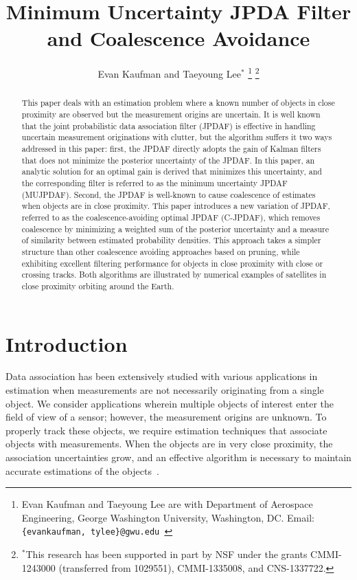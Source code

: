 \documentclass[letterpaper, 10pt, conference]{ieeeconf}
\title{\LARGE \bf
Minimum Uncertainty JPDA Filter and Coalescence Avoidance}
\author{Evan Kaufman and Taeyoung Lee$^*$%
 \thanks{Evan Kaufman and Taeyoung Lee are with Department of Aerospace Engineering, George Washington University, Washington, DC. Email: {\tt\footnotesize \{evankaufman, tylee\}@gwu.edu }}
\thanks{$^*$This research has been supported in part by NSF under the grants CMMI-1243000 (transferred from 1029551), CMMI-1335008, and CNS-1337722.}}
\begin{document}
\allowdisplaybreaks


\maketitle \thispagestyle{empty} \pagestyle{empty}

\begin{abstract}
This paper deals with an estimation problem where a known number of objects in close proximity are observed but the measurement origins are uncertain.
It is well known that the joint probabilistic data association filter (JPDAF) is effective in handling uncertain measurement originations with clutter, but the algorithm suffers it two ways addressed in this paper: first, the JPDAF directly adopts the gain of Kalman filters that does not minimize the posterior uncertainty of the JPDAF.
In this paper, an analytic solution for an optimal gain is derived that minimizes this uncertainty, and the corresponding filter is referred to as the minimum uncertainty JPDAF (MUJPDAF).
Second, the JPDAF is well-known to cause coalescence of estimates when objects are in close proximity.
This paper introduces a new variation of JPDAF, referred to as the coalescence-avoiding optimal JPDAF (C-JPDAF), which removes coalescence by minimizing a weighted sum of the posterior uncertainty and a measure of similarity between estimated probability densities.
This approach takes a simpler structure than other coalescence avoiding approaches based on pruning, while exhibiting excellent filtering performance for objects in close proximity with close or crossing tracks. Both algorithms are illustrated by numerical examples of satellites in close proximity orbiting around the Earth.
\end{abstract}


\section{Introduction}

Data association has been extensively studied with various applications in estimation when measurements are not necessarily originating from a single object.
We consider applications wherein multiple objects of interest enter the field of view of a sensor; however, the measurement origins are unknown.
To properly track these objects, we require estimation techniques that associate objects with measurements.
When the objects are in very close proximity, the association uncertainties grow, and an effective algorithm is necessary to maintain accurate estimations of the objects~\cite{KauLovLee14}.
\end{document}
